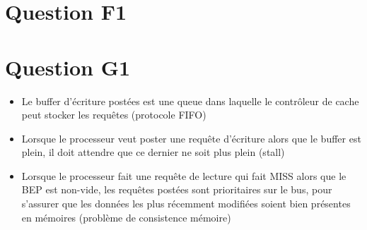 \documentclass[10pt]{article}
\begin{document}
\newpage

\section{Question F1}


\section{Question G1}
\begin{itemize}
  \item Le buffer d'écriture postées est une queue dans laquelle le contrôleur
  de cache peut stocker les requêtes (protocole FIFO)
  \item Lorsque le processeur veut poster une requête d'écriture alors que le
  buffer est plein, il doit attendre que ce dernier ne soit plus plein (stall)
  \item Lorsque le processeur fait une requête de lecture qui fait MISS alors
  que le BEP est non-vide, les requêtes postées sont prioritaires sur le bus,
  pour s'assurer que les données les plus récemment modifiées soient bien
  présentes en mémoires (problème de consistence mémoire)
\end{itemize}
\end{document}
